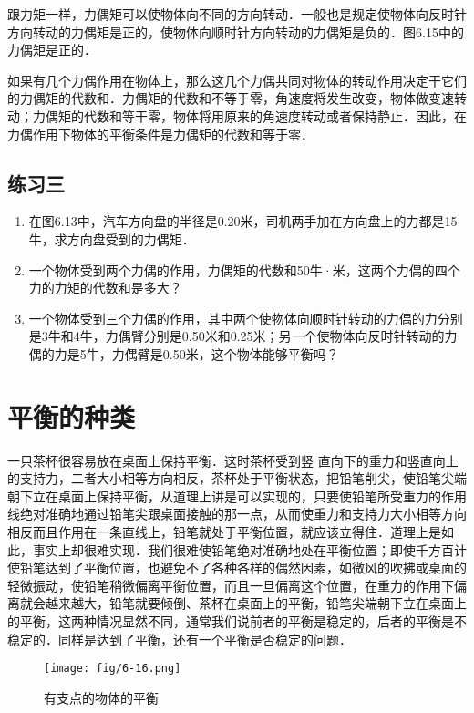 跟力矩一样，力偶矩可以使物体向不同的方向转动．一般也是规定使物体向反时针方向转动的力偶矩是正的，使物体向顺时针方向转动的力偶矩是负的．图6.15中的力偶矩是正的．




如果有几个力偶作用在物体上，那么这几个力偶共同对物体的转动作用决定干它们的力偶矩的代数和．力偶矩的代数和不等于零，角速度将发生改变，物体做变速转动；力偶矩的代数和等干零，物体将用原来的角速度转动或者保持静止．因此，在力偶作用下物体的平衡条件是力偶矩的代数和等于零．

\subsection*{练习三}
\begin{enumerate}
    \item 在图6.13中，汽车方向盘的半径是0.20米，司机两手加在方向盘上的力都是15牛，求方向盘受到的力偶矩．
    \item 一个物体受到两个力偶的作用，力偶矩的代数和50牛·米，这两个力偶的四个力的力矩的代数和是多大？
    \item 一个物体受到三个力偶的作用，其中两个使物体向顺时针转动的力偶的力分别是3牛和4牛，力偶臂分别是0.50米和0.25米；另一个使物体向反时针转动的力偶的力是5牛，力偶臂是0.50米，这个物体能够平衡吗？
\end{enumerate}

\section{平衡的种类}
一只茶杯很容易放在桌面上保持平衡．这时茶杯受到竖
直向下的重力和竖直向上的支持力，二者大小相等方向相反，茶杯处于平衡状态，把铅笔削尖，使铅笔尖端朝下立在桌面上保持平衡，从道理上讲是可以实现的，只要使铅笔所受重力的作用线绝对准确地通过铅笔尖跟桌面接触的那一点，从而使重力和支持力大小相等方向相反而且作用在一条直线上，铅笔就处于平衡位置，就应该立得住．道理上是如此，事实上却很难实现．我们很难使铅笔绝对准确地处在平衡位置；即使千方百计使铅笔达到了平衡位置，也避免不了各种各样的偶然因素，如微风的吹拂或桌面的轻微振动，使铅笔稍微偏离平衡位置，而且一旦偏离这个位置，在重力的作用下偏离就会越来越大，铅笔就要倾倒、茶杯在桌面上的平衡，铅笔尖端朝下立在桌面上的平衡，这两种情况显然不同，通常我们说前者的平衡是稳定的，后者的平衡是不稳定的．同样是达到了平衡，还有一个平衡是否稳定的问题．
\begin{figure}[htp]
\centering\texttt{[image: fig/6-16.png]}
\caption{有支点的物体的平衡}
\end{figure}

